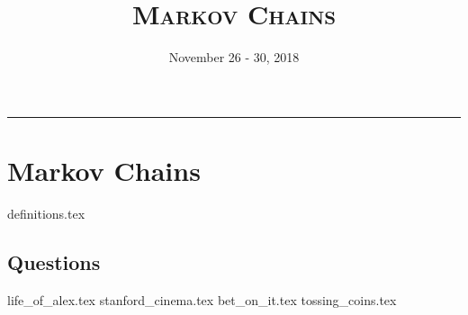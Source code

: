 \documentclass{exam}
\title{\textsc{Markov Chains}}
\date{November 26 - 30, 2018}
\begin{document}
\maketitle
\rule{\textwidth}{0.15em}
\fontsize{12}{15}\selectfont
\thispagestyle{empty}

\begin{comment}
\section{Confidence Intervals}
\subsection{Questions}
\begin{questions}
{intro_prob.tex}
{unknown_die.tex}
\end{questions}
\newpage 
\end{comment}

\section{Markov Chains}
{definitions.tex}
\subsection{Questions}
\begin{questions}
{life_of_alex.tex}
{stanford_cinema.tex}
{bet_on_it.tex}
{tossing_coins.tex}
\end{questions}
\end{document}
